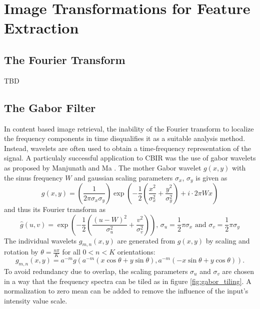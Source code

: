 \section{Image Transformations for Feature Extraction}

\subsection{The Fourier Transform}

TBD

\subsection{The Gabor Filter}

In content based image retrieval, the inability of the Fourier transform to
localize the frequency components in time disqualifies it as a suitable
analysis method. Instead, wavelets are often used to obtain a time-frequency
representation of the signal. A particulaly successful application to CBIR was
the use of gabor wavelets as proposed by Manjunath and Ma
\autocite{manjunath_texture_1996}. The mother Gabor wavelet $g(x, y)$ with the
sinus frequency $W$ and gaussian scaling parameters $\sigma_x$, $\sigma_y$ is
given as
\begin{equation*}
    g(x, y) = \left( \frac{1}{2 \pi \sigma_x \sigma_y} \right) \exp{\left( - \frac{1}{2} \left( \frac{x^2}{\sigma_x^2} + \frac{y^2}{\sigma_y^2} \right) + i \cdot 2 \pi W x \right)}
\end{equation*}
and thus its Fourier transform as
\begin{equation*}
    \hat{g}(u, v) = \exp{\left( - \frac{1}{2} \left( \frac{(u - W)^2}{\sigma_u^2} + \frac{v^2}{\sigma_v^2} \right) \right)}\text{, }
    \sigma_u = \frac{1}{2} \pi \sigma_x \text{ and } \sigma_v = \frac{1}{2} \pi \sigma_y
\end{equation*}
The individual wavelets $g_{m, n}(x, y)$ are generated from $g(x, y)$ by
scaling and rotation by $\theta = \frac{n \pi}{K}$ for all $0 < n < K$
orientations:
\begin{equation*}
    g_{m, n}(x, y) = a^{-m} g \left( a^{-m} (x \cos{\theta} + y \sin{\theta}), a^{-m} (-x \sin{\theta} + y \cos{\theta}) \right).
\end{equation*}
To avoid redundancy due to overlap, the scaling parameters $\sigma_u$ and
$\sigma_v$ are chosen in a way that the frequency spectra can be tiled as in
figure \ref{fig:gabor_tiling}. A normalization to zero mean can be added to
remove the influence of the input's intensity value scale.

